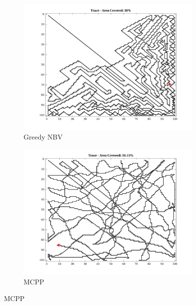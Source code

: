 \begin{figure}[htb!]
    \centering
    \begin{subfigure}[t]{0.25\textwidth}
        \centering
        \includegraphics[width=\linewidth]{figures/path_greedy_30p_100x100_sf_25_seed_1.png}
        \captionsetup{skip=0.20\baselineskip,size=footnotesize}
        \caption{Greedy NBV}
    \end{subfigure}%
    \begin{subfigure}[t]{0.25\textwidth}
        \centering
        \includegraphics[width=\linewidth]{figures/path_mc_30p_100x100_sf_25_seed_1.png}
        \captionsetup{skip=0.20\baselineskip,size=footnotesize}
        \caption{MCPP}
    \end{subfigure}%

\end{figure}
